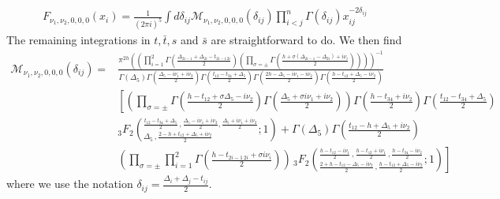 \begin{align}
  F_{\nu_1, \nu_2,0,0,0}(x_i)= \frac{1}{(2\pi i)^5}\int d\delta_{ij}  \mathcal{M}_{\nu_1, \nu_2,0,0,0}(\delta_{ij})\prod_{i<j}^{n}\Gamma(\delta_{ij})x_{ij}^{-2\delta_{ij}}
\end{align}
The remaining integrations in $t, \bar{t}, s$ and $\bar{s}$ are straightforward to do. We then find
\begin{align}
  \mathcal{M}_{\nu_1, \nu_2,0,0,0}(\delta_{ij})= & {\textstyle\frac{\pi^{2h}\left(\left(\prod_{i=1}^{2}\Gamma\left(\frac{\Delta_{2i-1}+\Delta_{2i}-t_{2i-1\,2i}}{2}\right)\left(\prod_{\sigma=\pm}\Gamma\left(\frac{h+\sigma \left(\Delta_{2i-1}-\Delta_{2i}\right)+i \nu_i}{2}\right)\right)\right)\right)^{-1}}{\Gamma \left(\Delta _5\right) \Gamma \left(\frac{\Delta _5-i \nu _1+i \nu _2}{2}\right) \Gamma \left(\frac{t_{12}-t_{34}+\Delta _5}{2}\right) \Gamma \left(\frac{2 h-\Delta _5-i \nu _1-i \nu _2}{2}\right) \Gamma \left(\frac{h-t_{12}+\Delta _5-i \nu _2}{2}\right)}} \\
                                       & {\textstyle\left[\left(\prod_{\sigma=\pm}\Gamma\left(\frac{h-t_{12}+\sigma\Delta_5-i \nu_2}{2}\right)\Gamma\left(\frac{\Delta_5+\sigma i \nu_1+i \nu_2}{2}\right)\right)\Gamma\left(\frac{h-t_{34}+i \nu_2}{2}\right)\Gamma\left(\frac{t_{12}-t_{34}+\Delta_5}{2}\right)\right.}\nonumber                                                                                                                                                                                                                                                       \\
                                       & {\textstyle\left. _3F_2\left(_{\Delta_5\,,\frac{2-h+t_{12}+\Delta_5+i\nu_2}{2}}^{\frac{t_{12}-t_{34}+\Delta_5}{2}\,,\frac{\Delta_5-i \nu_1+i \nu_2}{2},\frac{\Delta_5+i \nu_1+i \nu_2}{2}};1\right)+\Gamma\left(\Delta_5\right)\Gamma\left(\frac{t_{12}-h+\Delta_5+i \nu_2}{2}\right)\right.}\nonumber                                                                                                                                                                                                                                          \\
                                       & {\textstyle \left.\left(\prod_{\sigma=\pm}\prod_{i=1}^{2}\Gamma\left(\frac{h-t_{2i-1\,2i}+\sigma i\nu_i}{2}\right)\right)\,_3F_2\left(_{\frac{2+h-t_{12}-\Delta_5-i\nu_2}{2}\,,\frac{h-t_{12}+\Delta_5-i\nu_2}{2}}^{\frac{h-t_{12}-i\nu_1}{2}\,,\frac{h-t_{12}+i\nu_1}{2}\,,\frac{h-t_{34}-i\nu_2}{2}};1\right)\right]}\nonumber
\end{align}
where we use the notation $\delta_{ij}=\frac{\Delta_i+\Delta_j-t_{ij}}{2}$.

